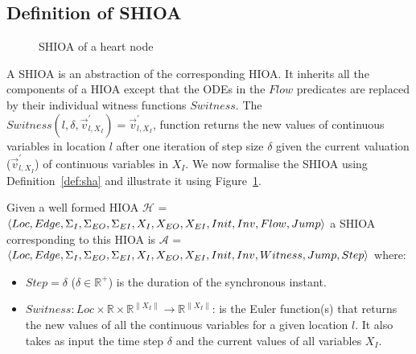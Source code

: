 
\subsection{Definition of \acf{SHIOA}}
\label{sec:defSHA}

\begin{figure}
  \centering
  
  \caption{\acf{SHIOA} of a heart node \label{fig:heartCellSHA}}
\end{figure}

A \ac{SHIOA} is an abstraction of the corresponding \ac{HIOA}.  It
inherits all the components of a \ac{HIOA} except that the ODEs in the
$Flow$ predicates are replaced by their individual witness functions
$Switness$. The
$Switness(l,\delta,\vec{v}^{\prime}_{l,X_{I}})=\vec{v}^{\prime}_{l,X_{I}}$,
function returns the new values of continuous variables in location $l$
after one iteration of step size $\delta$ given the current valuation
($\vec{v}^{\prime}_{l,X_{I}}$) of continuous variables in $X_{I}$.  We
now formalise the \ac{SHIOA} using Definition~\ref{def:sha} and
illustrate it using Figure~\ref{fig:heartCellSHA}.

\begin{definition}
  Given a well formed HIOA $\mathcal{H}$ =
  $\langle Loc, Edge, \Sigma_I, \Sigma_{EO}, \Sigma_{EI}, X_I, X_{EO},
  X_{EI}, \linebreak Init, Inv, Flow, Jump\rangle$
  a SHIOA corresponding to this HIOA is $\mathcal{A}$ =
  $\langle Loc, Edge, \Sigma_I, \Sigma_{EO}, \Sigma_{EI}, X_I,
  X_{EO},\linebreak X_{EI}, Init, Inv, Witness, Jump, Step\rangle$
  where:
  \begin{itemize}
  \item $Step = \delta$ ($\delta \in \mathbb{R}^+$) is the duration of
    the synchronous instant.
  \item
    $Switness: Loc \times \mathbb{R} \times \mathbb{R}^{\|X_{I}\|}
    \rightarrow \mathbb{R}^{\|X_{I}\|}$:
    is the Euler function(s) that returns the new values of all the
    continuous variables for a given location $l$.  It also takes as
    input the time step $\delta$ and the current values of all variables
    $X_{I}$.
  \end{itemize}
  \label{def:sha}
\end{definition}


